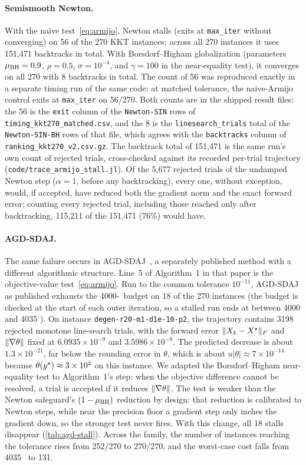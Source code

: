 \paragraph{Semismooth Newton.}
With the naive test~\eqref{eq:armijo}, Newton stalls (exits at
\texttt{max\_iter} without converging) on 56 of the 270 KKT
instances; across all 270 instances it uses 151{,}471 backtracks in total.
With Borsdorf--Higham globalization
(parameters $\mu_{\mathrm{BH}}=0.9$, $\rho=0.5$, $\sigma=10^{-4}$, and $\gamma=100$ in the
near-equality test), it converges on all 270 with 8 backtracks in total. The count of
56 was reproduced exactly in a separate timing run of the same code: at
matched tolerance, the naive-Armijo control exits at \texttt{max\_iter} on
56/270. Both counts are in the shipped result files: the 56 is the
\texttt{exit} column of the \texttt{Newton-SIN} rows of
\texttt{timing\_kkt270\_matched.csv}, and the 8 is the
\texttt{linesearch\_trials} total of the \texttt{Newton-SIN-BH} rows of that
file, which agrees with the \texttt{backtracks} column of
\texttt{ranking\_kkt270\_v2.csv.gz}. The backtrack total of 151{,}471 is the
same run's own count of rejected trials, cross-checked against its
recorded per-trial trajectory (\texttt{code/trace\_armijo\_stall.jl}). Of the 5{,}677
rejected trials of the undamped Newton step ($\alpha=1$, before any
backtracking), every one, without exception, would, if accepted, have
reduced both the gradient norm and the exact forward error; counting every
rejected trial, including those reached only after backtracking, 115{,}211
of the 151{,}471 (76\%) would have.

\paragraph{AGD-SDAJ.}
The same failure occurs in AGD-SDAJ~\cite{huynh2025accelerated}, a separately
published method with a different algorithmic structure. Line~5 of
Algorithm~1 in that paper is the objective-value test~\eqref{eq:armijo}. Run
to the common tolerance $10^{-11}$, AGD-SDAJ as published exhausts the 4000-\EVD\
budget on 18 of the 270 instances (the budget is checked at the start of each
outer iteration, so a stalled run ends at between 4000 and 4035 \EVDs). On instance
\texttt{degen-r20-m1-d1e-10-p2}, the trajectory contains 3198 rejected
monotone line-search trials, with the forward error $\lVert X_k-X^\star\rVert_F$ and
$\lVert \nabla\theta\rVert$ fixed at $6.0935\times10^{-9}$ and
$3.5986\times10^{-9}$. The predicted decrease is about $1.3\times10^{-21}$,
far below the rounding error in $\theta$, which is about $u|\theta|\approx
7\times10^{-14}$ because $\theta(y^\star)\approx3\times10^{2}$ on this instance.
We adapted the Borsdorf--Higham near-equality test to
Algorithm~1's step: when the objective difference cannot be resolved, a trial
is accepted if it reduces $\lVert \nabla\theta\rVert$. The test is weaker than the
Newton safeguard's $(1-\mu_{\mathrm{BH}})$ reduction by design: that reduction is calibrated
to Newton steps, while near the precision floor a gradient step only inches the
gradient down, so the stronger test never fires. With
this change, all 18
stalls disappear (\cref{tab:agd-stall}). Across the family, the number of
instances reaching the tolerance rises from 252/270 to 270/270, and the
worst-case cost falls from 4035 \EVDs\ to 131.

